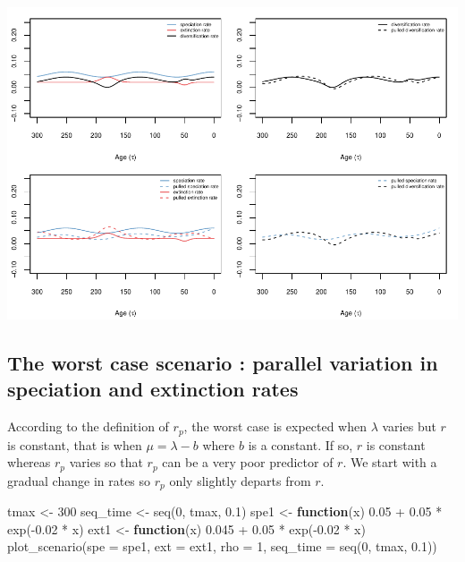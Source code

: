 \documentclass[
]{article}
\newenvironment{Shaded}{\begin{snugshade}}{\end{snugshade}}
\newcommand{\AttributeTok}[1]{\textcolor[rgb]{0.77,0.63,0.00}{#1}}
\newcommand{\ControlFlowTok}[1]{\textcolor[rgb]{0.13,0.29,0.53}{\textbf{#1}}}
\newcommand{\DecValTok}[1]{\textcolor[rgb]{0.00,0.00,0.81}{#1}}
\newcommand{\FloatTok}[1]{\textcolor[rgb]{0.00,0.00,0.81}{#1}}
\newcommand{\FunctionTok}[1]{\textcolor[rgb]{0.00,0.00,0.00}{#1}}
\newcommand{\NormalTok}[1]{#1}
\newcommand{\OtherTok}[1]{\textcolor[rgb]{0.56,0.35,0.01}{#1}}
\newcommand{\SpecialCharTok}[1]{\textcolor[rgb]{0.00,0.00,0.00}{#1}}
\begin{document}
\includegraphics{supplement_files/figure-latex/unnamed-chunk-16-1.pdf}

\pagebreak

\hypertarget{the-worst-case-scenario-parallel-variation-in-speciation-and-extinction-rates}{%
\subsection{The worst case scenario : parallel variation in speciation
and extinction
rates}\label{the-worst-case-scenario-parallel-variation-in-speciation-and-extinction-rates}}

According to the definition of \(r_p\), the worst case is expected when
\(\lambda\) varies but \(r\) is constant, that is when
\(\mu = \lambda - b\) where \(b\) is a constant. If so, \(r\) is
constant whereas \(r_p\) varies so that \(r_p\) can be a very poor
predictor of \(r\). We start with a gradual change in rates so \(r_p\)
only slightly departs from \(r\).

\begin{Shaded}
\begin{Highlighting}[]
\NormalTok{tmax }\OtherTok{\textless{}{-}} \DecValTok{300}
\NormalTok{seq\_time }\OtherTok{\textless{}{-}} \FunctionTok{seq}\NormalTok{(}\DecValTok{0}\NormalTok{, tmax, }\FloatTok{0.1}\NormalTok{)}
\NormalTok{spe1 }\OtherTok{\textless{}{-}} \ControlFlowTok{function}\NormalTok{(x) }\FloatTok{0.05} \SpecialCharTok{+} \FloatTok{0.05} \SpecialCharTok{*} \FunctionTok{exp}\NormalTok{(}\SpecialCharTok{{-}}\FloatTok{0.02} \SpecialCharTok{*}\NormalTok{ x)}
\NormalTok{ext1 }\OtherTok{\textless{}{-}} \ControlFlowTok{function}\NormalTok{(x) }\FloatTok{0.045} \SpecialCharTok{+} \FloatTok{0.05} \SpecialCharTok{*} \FunctionTok{exp}\NormalTok{(}\SpecialCharTok{{-}}\FloatTok{0.02} \SpecialCharTok{*}\NormalTok{ x)}
\FunctionTok{plot\_scenario}\NormalTok{(}\AttributeTok{spe =}\NormalTok{ spe1, }\AttributeTok{ext =}\NormalTok{ ext1, }\AttributeTok{rho =} \DecValTok{1}\NormalTok{, }\AttributeTok{seq\_time =} \FunctionTok{seq}\NormalTok{(}\DecValTok{0}\NormalTok{,}
\NormalTok{    tmax, }\FloatTok{0.1}\NormalTok{))}
\end{Highlighting}
\end{Shaded}
\end{document}
